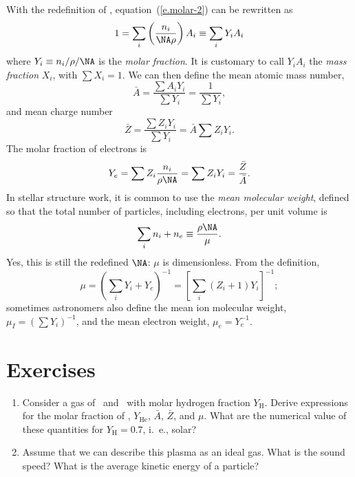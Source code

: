 With the redefinition of \NA, equation~(\ref{e.molar-2}) can be rewritten as
\begin{equation}\label{e.}
1 = \sum_{i}\left(\frac{n_{i}}{\NA\rho}\right)A_{i} \equiv \sum_{i}Y_{i}A_{i}
\end{equation}
where $Y_{i} \equiv n_{i}/\rho/\NA$ is the \emph{molar fraction}. It is customary to call $Y_{i}A_{i}$ the \emph{mass fraction} $X_{i}$, with $\sum X_{i} = 1$. We can then define the mean atomic mass number,
\begin{equation}\label{e.mean-A}
\bar{A} = \frac{\sum A_{i}Y_{i}}{\sum Y_{i}} = \frac{1}{\sum Y_{i}},
\end{equation}
and mean charge number
\begin{equation}\label{e.mean-Z}
\bar{Z} = \frac{\sum Z_{i}Y_{i}}{\sum Y_{i}} = \bar{A} \sum Z_{i}Y_{i}.
\end{equation}
The molar fraction of electrons is
\begin{equation}\label{e.Ye}
Y_{e} = \sum Z_{i} \frac{n_{i}}{\rho\NA} = \sum Z_{i}Y_{i} = \frac{\bar{Z}}{\bar{A}}.
\end{equation}
In stellar structure work, it is common to use the \emph{mean molecular weight}, defined so that the total number of particles, including electrons, per unit volume is
\begin{equation}\label{e.mean-molecular-weight}
\sum_{i} n_{i} + n_{e} \equiv \frac{\rho\NA}{\mu}.
\end{equation}
Yes, this is still the redefined $\NA$: $\mu$ is dimensionless. From the definition,
\[
\mu = \left(\sum_{i}Y_{i} + Y_{e}\right)^{-1} = \left[ \sum_{i}\left(Z_{i}+1\right)Y_{i} \right]^{-1};
\]
sometimes astronomers also define the mean ion molecular weight, $\mu_{I} = (\sum Y_{i})^{-1}$, and the mean electron weight, $\mu_{e} = Y_{e}^{-1}$.

\section{Exercises}
\begin{enumerate}
\item Consider a gas of \hydrogen\ and \helium\ with molar hydrogen fraction $Y_{\mathrm{H}}$.  Derive expressions for the molar fraction of \helium, $Y_{\mathrm{He}}$, $\bar{A}$, $\bar{Z}$, and $\mu$. What are the numerical value of these quantities for $Y_{\mathrm{H}} = 0.7$, i.~e., solar?
\item Assume that we can describe this plasma as an ideal gas.  What is the sound speed? What is the average kinetic energy of a particle?
\end{enumerate}
